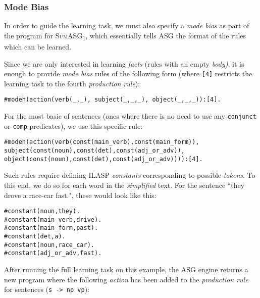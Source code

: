 \subsubsection*{Mode Bias}

In order to guide the learning task, we must also specify a \textit{mode bias} as part of the program for \textsc{SumASG\textsubscript{1}}, which essentially tells ASG the format of the rules which can be learned.

Since we are only interested in learning \textit{facts} (rules with an empty \textit{body)}, it is enough to provide \textit{mode bias} rules of the following form (where \texttt{[4]} restricts the learning task to the fourth \textit{production rule}):

\begin{displayquote}
\begin{lstlisting}[numbers=none]
#modeh(action(verb(_,_), subject(_,_,_), object(_,_,_)):[4].
\end{lstlisting}
\end{displayquote}

\noindent
For the most basic of sentences (ones where there is no need to use any \texttt{conjunct} or \texttt{comp} predicates), we use this specific rule:

\begin{displayquote}
\begin{lstlisting}[numbers=none]
#modeh(action(verb(const(main_verb),const(main_form)), subject(const(noun),const(det),const(adj_or_adv)), object(const(noun),const(det),const(adj_or_adv)))):[4].
\end{lstlisting}
\end{displayquote}

\noindent
Such rules require defining ILASP \textit{constants} corresponding to possible \textit{tokens}. To this end, we do so for each word in the \textit{simplified} text. For the sentence ``they drove a race-car fast.", these would look like this:

\begin{displayquote}
\begin{lstlisting}
#constant(noun,they).
#constant(main_verb,drive).
#constant(main_form,past).
#constant(det,a).
#constant(noun,race_car).
#constant(adj_or_adv,fast).
\end{lstlisting}
\end{displayquote}

\noindent
After running the full learning task on this example, the ASG engine returns a new program where the following \textit{action} has been added to the \textit{production rule} for sentences (\texttt{s -> np vp}):

